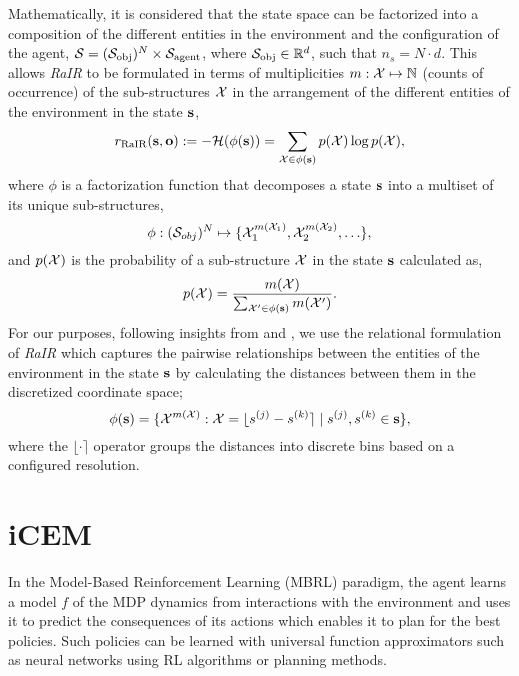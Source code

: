Mathematically, it is considered that the state space can be factorized into a composition of the different entities in the environment and the configuration of the agent, \(\mathcal{S} = (\mathcal{S}_{\text{obj}})^N \times \mathcal{S}_{\text{agent}}\), where \(\mathcal{S}_{\text{obj}} \in \mathbb{R}^d\), such that \(n_s = N \cdot d\).
This allows \textit{RaIR} to be formulated in terms of multiplicities \(m: \mathcal{X} \mapsto \mathbb{N}\) (counts of occurrence) of the sub-structures \(\mathcal{X}\) in the arrangement of the different entities of the environment in the state \(\mathbf{s}\),
\begin{equation}
    \label{eq:rair}
    r_{\text{RaIR}}(\mathbf{s}, \mathbf{o}) := -\mathcal{H}(\phi(\mathbf{s})) = \sum_{\mathcal{X} \in \phi(\mathbf{s})} p(\mathcal{X}) \log p(\mathcal{X}),
\end{equation}
where \(\phi\) is a factorization function that decomposes a state \(\mathbf{s}\) into a multiset of its unique sub-structures,
\begin{equation}
    \label{eq:rair-factorization}
    \phi : (\mathcal{S}_{obj})^{N} \mapsto \{ \mathcal{X}_1^{m(\mathcal{X}_1)}, \mathcal{X}_2^{m(\mathcal{X}_2)}, \ldots \},
\end{equation}
and \(p(\mathcal{X})\) is the probability of a sub-structure \(\mathcal{X}\) in the state \(\mathbf{s}\) calculated as,
\begin{equation}
    \label{eq:rair-probability}
    p(\mathcal{X}) = \frac{m(\mathcal{X})}{\sum_{\mathcal{X}' \in \phi(\mathbf{s})} m(\mathcal{X}')}.
\end{equation}
% 
For our purposes, following insights from \cite{symmetry} and \cite{compositional}, we use the relational formulation of \textit{RaIR} which captures the pairwise relationships between the entities of the environment in the state \(\mathbf{s}\) by calculating the distances between them in the discretized coordinate space;
\begin{equation}
    \label{eq:rair-relational}
    \phi(\mathbf{s}) = \{ \mathcal{X}^{m(\mathcal{X})} : \mathcal{X} = \lfloor s^{(j)} - s^{(k)} \rceil \mid s^{(j)}, s^{(k)} \in \mathbf{s} \},
\end{equation}
where the \(\lfloor\cdot\rceil\) operator groups the distances into discrete bins based on a configured resolution.

\section{iCEM}
\label{sec:icem}

In the Model-Based Reinforcement Learning (MBRL) paradigm, the agent learns a model \(f\) of the MDP dynamics from interactions with the environment and uses it to predict the consequences of its actions which enables it to plan for the best policies.
Such policies can be learned with universal function approximators such as neural networks using RL algorithms or planning methods.

